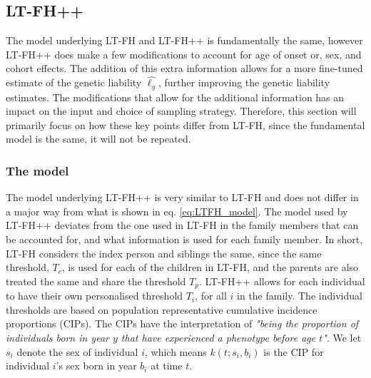 \subsection{LT-FH++}

The model underlying LT-FH and LT-FH++ is fundamentally the same, however LT-FH++ does make a few modifications to account for age of onset or, sex, and cohort effects. The addition of this extra information allows for a more fine-tuned estimate of the genetic liability $ \hat{\ell_g} $, further improving the genetic liability estimates. The modifications that allow for the additional information has an impact on the input and choice of sampling strategy. Therefore, this section will primarily focus on how these key points differ from LT-FH, since the fundamental model is the same, it will not be repeated. 

\subsubsection{The model}

The model underlying LT-FH++ is very similar to LT-FH and does not differ in a major way from what is shown in eq. \ref{eq:LTFH_model}. The model used by LT-FH++ deviates from the one used in LT-FH in the family members that can be accounted for, and what information is used for each family member. In short, LT-FH considers the index person and siblings the same, since the same threshold, $ T_c $, is used for each of the children in LT-FH, and the parents are also treated the same and share the threshold $ T_p $. LT-FH++ allows for each individual to have their own personalised threshold $ T_i $, for all $ i $ in the family. The individual thresholds are based on population representative cumulative incidence proportions (CIPs). The CIPs have the interpretation of \textit{"being the proportion of individuals born in year $ y $ that have experienced a phenotype before age $ t $"}. We let $ s_i $ denote the sex of individual $ i $, which means $ k(t; s_i, b_i) $ is the CIP for individual $ i $'s sex born in year $ b_i $ at time $ t $.


